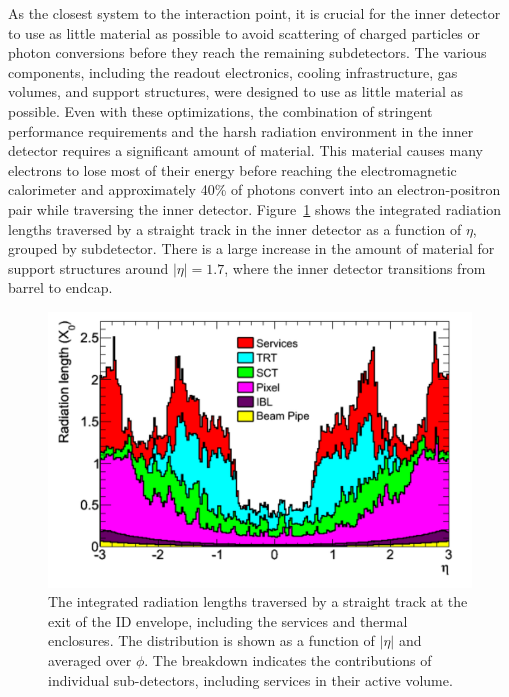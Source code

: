 As the closest system to the interaction point, it is crucial for the inner detector to use as little material as possible to avoid scattering of charged particles or photon conversions before they reach the remaining subdetectors.
The various components, including the readout electronics, cooling infrastructure, gas volumes, and support structures,  were designed to use as little material as possible. 
Even with these optimizations, the combination of stringent performance requirements and the harsh radiation environment in the inner detector requires a significant amount of material.
This material causes many electrons to lose most of their energy before reaching the electromagnetic calorimeter and approximately 40\% of photons convert into an electron-positron pair while traversing the inner detector.
Figure~\ref{fig:id_material} shows the integrated radiation lengths traversed by a straight track in the inner detector as a function of $\eta$, grouped by subdetector.
There is a large increase in the amount of material for support structures around $|\eta| = 1.7$, where the inner detector transitions from barrel to endcap.


\begin{figure}
\centering
\includegraphics[width=\fullfig]{figures/id_material_subdetector.png}
\caption{The integrated radiation lengths traversed by a straight track at the exit of the ID envelope, including the services and thermal enclosures. The distribution is shown as a function of $|\eta|$ and averaged over $\phi$. The breakdown indicates the contributions of individual sub-detectors, including services in their active volume.}
\label{fig:id_material}
\end{figure}


